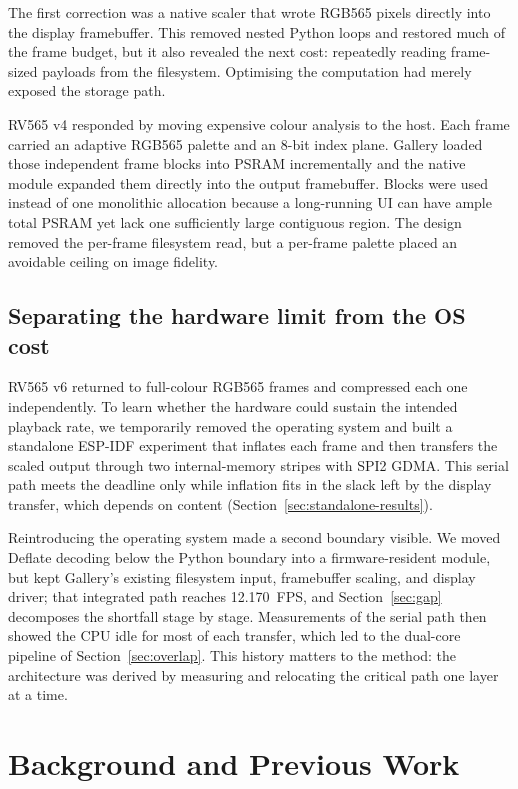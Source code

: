 \documentclass[11pt,twocolumn]{article}
\newcommand{\system}{RV565}
\begin{document}
The first correction was a native scaler that wrote RGB565 pixels directly
into the display framebuffer.  This removed nested Python loops and restored
much of the frame budget, but it also revealed the next cost: repeatedly
reading frame-sized payloads from the filesystem.  Optimising the computation
had merely exposed the storage path.

\system{} v4 responded by moving expensive colour analysis to the host.  Each
frame carried an adaptive RGB565 palette and an 8-bit index plane.  Gallery
loaded those independent frame blocks into PSRAM incrementally and the native
module expanded them directly into the output framebuffer.  Blocks were used
instead of one monolithic allocation because a long-running UI can have ample
total PSRAM yet lack one sufficiently large contiguous region.  The design
removed the per-frame filesystem read, but a per-frame palette placed an
avoidable ceiling on image fidelity.

\subsection{Separating the hardware limit from the OS cost}

\system{} v6 returned to full-colour RGB565 frames and compressed each one
independently.  To learn whether the hardware could sustain the intended
playback rate, we temporarily removed the operating system and built a
standalone ESP-IDF experiment that inflates each frame and then transfers the
scaled output through two internal-memory stripes with SPI2 GDMA.  This serial
path meets the deadline only while inflation fits in the slack left by the
display transfer, which depends on content (Section~\ref{sec:standalone-results}).

Reintroducing the operating system made a second boundary visible.  We moved
Deflate decoding below the Python boundary into a firmware-resident module,
but kept Gallery's existing filesystem input, framebuffer scaling, and display
driver; that integrated path reaches 12.170~FPS, and Section~\ref{sec:gap}
decomposes the shortfall stage by stage.  Measurements of the serial path then
showed the CPU idle for most of each transfer, which led to the dual-core
pipeline of Section~\ref{sec:overlap}.  This history matters to the method:
the architecture was derived by measuring and relocating the critical path one
layer at a time.

\section{Background and Previous Work}
\end{document}
